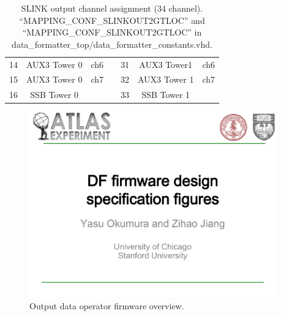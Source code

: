\documentclass[11pt,letterpaper]{article}
\begin{document}
\begin{table}[h]
\begin{tabular}{|c|c|c|c|c|c|c|}
14   & AUX3 Tower 0      & ch6          &  & 31   & AUX3 Tower1       & ch6          \\ \cline{1-3} \cline{5-7} 
15   & AUX3 Tower 0      & ch7          &  & 32   & AUX3 Tower 1      & ch7          \\ \cline{1-3} \cline{5-7} 
16   & SSB Tower 0       &              &  & 33   & SSB Tower 1       &              \\ \cline{1-3} \cline{5-7} 
\end{tabular}
\caption{SLINK output channel assignment (34 channel). 
``MAPPING\_CONF\_SLINKOUT2GTLOC'' and ``MAPPING\_CONF\_SLINKOUT2GTLOC'' in data\_formatter\_top/data\_formatter\_constants.vhd.}
\end{table}


\begin{figure}[h!]
  \centering
  \includegraphics[width=0.95\textwidth,clip,page=10]{figures.pdf}
  \caption{Output data operator firmware overview.}
  \label{fig:OUTPUT_DATA_OPERATOR_OVERVIEW}
\end{figure}
\end{document}
